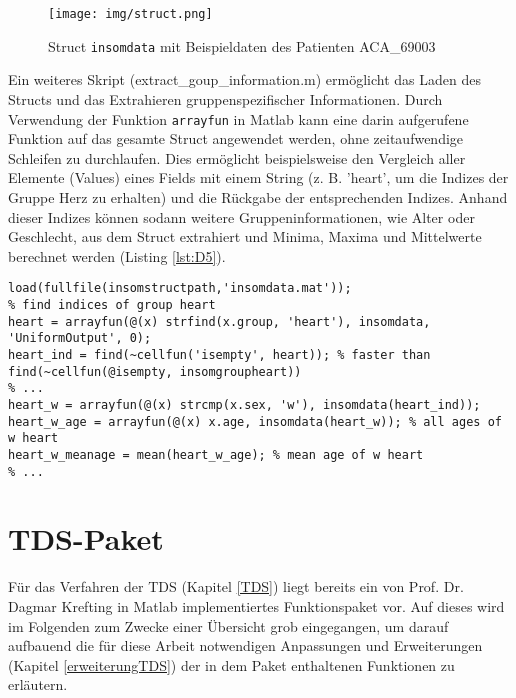 \begin{figure}[H]
	\centering
	\texttt{[image: img/struct.png]}
	\caption[Struct \texttt{insomdata} mit Beispieldaten]{Struct \texttt{insomdata} mit Beispieldaten des Patienten ACA\_69003}
	\label{fig:struct}
\end{figure}

Ein weiteres Skript (extract\_goup\_information.m) ermöglicht das Laden des Structs und das Extrahieren gruppenspezifischer Informationen. Durch Verwendung der Funktion \texttt{arrayfun} in Matlab kann eine darin aufgerufene Funktion auf das gesamte Struct angewendet werden, ohne zeitaufwendige Schleifen zu durchlaufen. Dies ermöglicht beispielsweise den Vergleich aller Elemente (Values) eines Fields mit einem String (z. B. 'heart', um die Indizes der Gruppe Herz zu erhalten) und die Rückgabe der entsprechenden Indizes. Anhand dieser Indizes können sodann weitere Gruppeninformationen, wie Alter oder Geschlecht, aus dem Struct extrahiert und Minima, Maxima und Mittelwerte berechnet werden (Listing \ref{lst:D5}).\\

\begin{lstlisting}[caption={Implementierung Kriterium D5 in Skript extract\_goup\_information.m}, label={lst:D5}]
% ...
load(fullfile(insomstructpath,'insomdata.mat'));
% find indices of group heart
heart = arrayfun(@(x) strfind(x.group, 'heart'), insomdata, 'UniformOutput', 0);
heart_ind = find(~cellfun('isempty', heart)); % faster than find(~cellfun(@isempty, insomgroupheart))
% ...
heart_w = arrayfun(@(x) strcmp(x.sex, 'w'), insomdata(heart_ind));
heart_w_age = arrayfun(@(x) x.age, insomdata(heart_w)); % all ages of w heart
heart_w_meanage = mean(heart_w_age); % mean age of w heart
% ...
\end{lstlisting}

\section{TDS-Paket}\label{tdsPaket}

Für das Verfahren der TDS (Kapitel \ref{TDS}) liegt bereits ein von Prof. Dr. Dagmar Krefting in Matlab implementiertes Funktionspaket vor. Auf dieses wird im Folgenden zum Zwecke einer Übersicht grob eingegangen, um darauf aufbauend die für diese Arbeit notwendigen Anpassungen und Erweiterungen (Kapitel \ref{erweiterungTDS}) der in dem Paket enthaltenen Funktionen zu erläutern.\\

